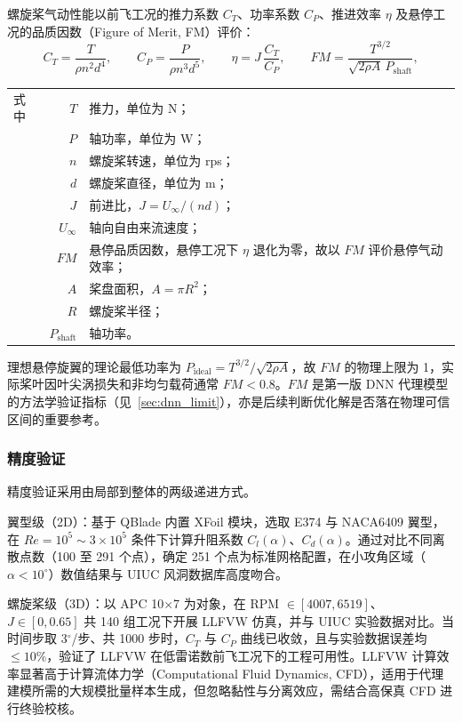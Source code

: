 螺旋桨气动性能以前飞工况的推力系数 $C_T$、功率系数 $C_P$、推进效率 $\eta$ 及悬停工况的品质因数（Figure of Merit, FM）评价：
\begin{equation}
C_T = \frac{T}{\rho n^2 d^4}, \qquad C_P = \frac{P}{\rho n^3 d^5}, \qquad \eta = J\,\frac{C_T}{C_P}, \qquad FM = \frac{T^{3/2}}{\sqrt{2\rho A}\,P_\text{shaft}},
\label{eq:fm}
\end{equation}
\noindent
\begin{tabularx}{\textwidth}{@{}l@{\quad}r@{———}X@{}}
式中  & $T$              & 推力，单位为 N；\\
     & $P$              & 轴功率，单位为 W；\\
     & $n$              & 螺旋桨转速，单位为 rps；\\
     & $d$              & 螺旋桨直径，单位为 m；\\
     & $J$              & 前进比，$J=U_\infty/(nd)$；\\
     & $U_\infty$       & 轴向自由来流速度；\\
     & $FM$             & 悬停品质因数，悬停工况下 $\eta$ 退化为零，故以 $FM$ 评价悬停气动效率；\\
     & $A$              & 桨盘面积，$A=\pi R^2$；\\
     & $R$              & 螺旋桨半径；\\
     & $P_\text{shaft}$ & 轴功率。\\
\end{tabularx}\vspace{3.15bp}

理想悬停旋翼的理论最低功率为 $P_\text{ideal} = T^{3/2}/\sqrt{2\rho A}$，故 $FM$ 的物理上限为 1，实际桨叶因叶尖涡损失和非均匀载荷通常 $FM < 0.8$。$FM$ 是第一版 DNN 代理模型的方法学验证指标（见~\ref{sec:dnn_limit}），亦是后续判断优化解是否落在物理可信区间的重要参考。

\subsubsection{精度验证}

精度验证采用由局部到整体的两级递进方式。

翼型级（2D）：基于 QBlade 内置 XFoil 模块，选取 E374 与 NACA6409 翼型，在 $Re = 10^5 \sim 3 \times 10^5$ 条件下计算升阻系数 $C_l(\alpha)$、$C_d(\alpha)$。通过对比不同离散点数（100 至 291 个点），确定 251 个点为标准网格配置，在小攻角区域（$\alpha < 10^\circ$）数值结果与 UIUC 风洞数据库高度吻合。

螺旋桨级（3D）：以 APC 10$\times$7 为对象，在 RPM $\in [4007, 6519]$、$J \in [0, 0.65]$ 共 140 组工况下开展 LLFVW 仿真，并与 UIUC 实验数据对比。当时间步取 3$^\circ$/步、共 1000 步时，$C_T$ 与 $C_P$ 曲线已收敛，且与实验数据误差均 $\leq 10\%$，验证了 LLFVW 在低雷诺数前飞工况下的工程可用性。LLFVW 计算效率显著高于计算流体力学（Computational Fluid Dynamics, CFD），适用于代理建模所需的大规模批量样本生成，但忽略黏性与分离效应，需结合高保真 CFD 进行终验校核。

